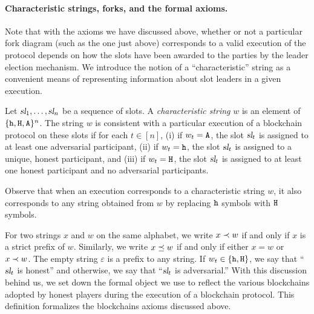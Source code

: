 \paragraph{Characteristic strings, forks, and the formal axioms.}
Note that with the axioms we have discussed above, whether or not a
particular fork diagram (such as the one just above) corresponds to a valid
execution of the protocol depends on how the slots have been awarded to the parties by the
leader election mechanism. We introduce the notion of a ``characteristic'' string as a convenient
means of representing information about slot leaders in a given execution.
\begin{definition}\label{def:trivalent-char-string}
  Let $\textsl{sl}_1, \ldots, \textsl{sl}_{n}$ be a sequence of slots.  A
  \emph{characteristic string} $w$ is an element of
  $\{\mathtt{h},\mathtt{H},\mathtt{A}\}^n$. The string $w$ is consistent with a particular
  execution of a blockchain protocol on these slots if for each
  $t \in [n]$, (i) if $w_t = \mathtt{A}$, the slot $\textsl{sl}_t$ is assigned to
  at least one adversarial participant, (ii) if $w_t = \mathtt{h}$, the slot
  $\textsl{sl}_{t}$ is assigned to a unique, honest participant, and (iii)
  if $w_t = \mathtt{H}$, the slot $\textsl{sl}_{t}$ is assigned to at least one
  honest participant and no adversarial participants.

  Observe that when an execution corresponds to a characteristic
  string $w$, it also corresponds to any string obtained from $w$ by
  replacing $\mathtt{h}$ symbols with $\mathtt{H}$ symbols.
% 
\end{definition}
For two strings $x$ and $w$ on the same alphabet, 
we write $x \prec w$ if and only if $x$ is a strict prefix of $w$. 
Similarly, 
we write $x \preceq w$ if and only if either $x = w$ or $x \prec w$. 
The empty string $\varepsilon$ is a prefix to any string. 
If $w_t \in \{\mathtt{h}, \mathtt{H}\}$, we say that ``$\textsl{sl}_t$ is honest'' and 
otherwise, we say that ``$\textsl{sl}_t$ is adversarial.'' 
With this discussion behind us, we set down the formal object we use
to reflect the various blockchains adopted by honest players during
the execution of a blockchain protocol. This definition formalizes the blockchains axioms discussed above.

